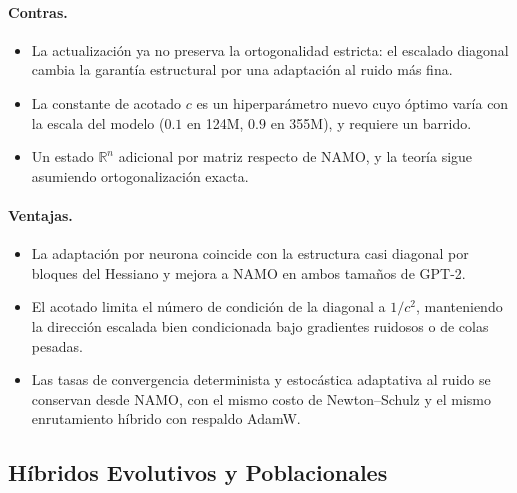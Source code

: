 \paragraph{Contras.}
\begin{itemize}[leftmargin=*]
\item La actualización ya no preserva la ortogonalidad estricta: el escalado diagonal
  cambia la garantía estructural por una adaptación al ruido más fina.
\item La constante de acotado $c$ es un hiperparámetro nuevo cuyo óptimo varía con la
  escala del modelo ($0.1$ en 124M, $0.9$ en 355M), y requiere un barrido.
\item Un estado $\mathbb{R}^n$ adicional por matriz respecto de NAMO, y la teoría sigue
  asumiendo ortogonalización exacta.
\end{itemize}

\paragraph{Ventajas.}
\begin{itemize}[leftmargin=*]
\item La adaptación por neurona coincide con la estructura casi diagonal por bloques del
  Hessiano y mejora a NAMO en ambos tamaños de GPT-2.
\item El acotado limita el número de condición de la diagonal a $1/c^2$, manteniendo la
  dirección escalada bien condicionada bajo gradientes ruidosos o de colas pesadas.
\item Las tasas de convergencia determinista y estocástica adaptativa al ruido se
  conservan desde NAMO, con el mismo costo de Newton--Schulz y el mismo enrutamiento
  híbrido con respaldo AdamW.
\end{itemize}

\subsection{Híbridos Evolutivos y Poblacionales}

